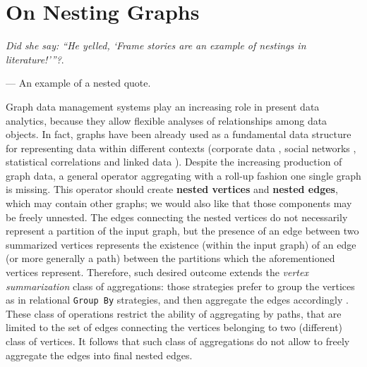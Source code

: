 \chapter{On Nesting Graphs}\label{cha:nesting}

\epigraph{\textit{Did she say: ``He yelled, \lq Frame stories are an example of nestings in literature!\rq\;''?}.}{--- An example of a nested quote.}

\newcommand{\trf}{\hl{\texttt{[REF]}}}
Graph data management systems play an increasing role in present data analytics, because they allow flexible analyses of relationships among data objects. In fact, graphs have been already used as a fundamental data structure for representing data within different contexts (corporate data \cite{success,Park2016355}, social networks \cite{xie,BrodkaK14}, statistical correlations \cite{StatisticalModels} and linked data \cite{Vasilyeva13,BarabucciEARMARK}). Despite the increasing production of graph data, a general operator aggregating with a roll-up fashion one single graph is missing. This operator should create \textbf{nested vertices} and \textbf{nested edges}, which may contain other graphs; we would also like that those components may be freely unnested. The edges connecting the nested vertices do not necessarily represent a partition of the input graph, but the presence of an edge between two summarized vertices represents the existence (within the input graph) of an edge (or more generally a path) between the partitions which the aforementioned vertices represent. Therefore, such desired outcome extends the \textit{vertex summarization} class of aggregations: those strategies prefer to group the vertices as in relational \texttt{Group By} strategies, and then aggregate the edges accordingly \cite{JunghannsPR17}. These class of operations restrict the ability of aggregating by paths, that are limited to the set of edges connecting the vertices belonging to two (different) class of vertices. It follows that such class of aggregations   do not allow to freely aggregate the edges into final nested edges. 


